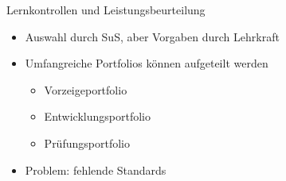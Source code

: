 \documentclass{article}
\begin{document}
\begin{block}{Lernkontrollen und Leistungsbeurteilung}
\begin{itemize}
\begin{itemize}
            \item Auswahl durch SuS, aber Vorgaben durch Lehrkraft
            \item Umfangreiche Portfolios können aufgeteilt werden
            \begin{itemize}
                \item Vorzeigeportfolio
                \item Entwicklungsportfolio
                \item Prüfungsportfolio
            \end{itemize}
            \item Problem: fehlende Standards
        \end{itemize}
    \end{itemize}
\end{block}
\end{document}
